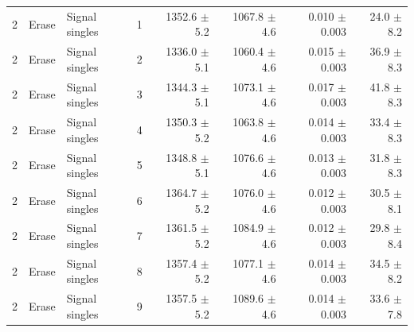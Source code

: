 \begin{tabular}{llllrrrr}
\midrule
2 & Erase & Signal singles & 1 & 1352.6 \ensuremath{\pm} 5.2 & 1067.8 \ensuremath{\pm} 4.6 & 0.010 \ensuremath{\pm} 0.003 & 24.0 \ensuremath{\pm} 8.2 \\
2 & Erase & Signal singles & 2 & 1336.0 \ensuremath{\pm} 5.1 & 1060.4 \ensuremath{\pm} 4.6 & 0.015 \ensuremath{\pm} 0.003 & 36.9 \ensuremath{\pm} 8.3 \\
2 & Erase & Signal singles & 3 & 1344.3 \ensuremath{\pm} 5.1 & 1073.1 \ensuremath{\pm} 4.6 & 0.017 \ensuremath{\pm} 0.003 & 41.8 \ensuremath{\pm} 8.3 \\
2 & Erase & Signal singles & 4 & 1350.3 \ensuremath{\pm} 5.2 & 1063.8 \ensuremath{\pm} 4.6 & 0.014 \ensuremath{\pm} 0.003 & 33.4 \ensuremath{\pm} 8.3 \\
2 & Erase & Signal singles & 5 & 1348.8 \ensuremath{\pm} 5.1 & 1076.6 \ensuremath{\pm} 4.6 & 0.013 \ensuremath{\pm} 0.003 & 31.8 \ensuremath{\pm} 8.3 \\
2 & Erase & Signal singles & 6 & 1364.7 \ensuremath{\pm} 5.2 & 1076.0 \ensuremath{\pm} 4.6 & 0.012 \ensuremath{\pm} 0.003 & 30.5 \ensuremath{\pm} 8.1 \\
2 & Erase & Signal singles & 7 & 1361.5 \ensuremath{\pm} 5.2 & 1084.9 \ensuremath{\pm} 4.6 & 0.012 \ensuremath{\pm} 0.003 & 29.8 \ensuremath{\pm} 8.4 \\
2 & Erase & Signal singles & 8 & 1357.4 \ensuremath{\pm} 5.2 & 1077.1 \ensuremath{\pm} 4.6 & 0.014 \ensuremath{\pm} 0.003 & 34.5 \ensuremath{\pm} 8.2 \\
2 & Erase & Signal singles & 9 & 1357.5 \ensuremath{\pm} 5.2 & 1089.6 \ensuremath{\pm} 4.6 & 0.014 \ensuremath{\pm} 0.003 & 33.6 \ensuremath{\pm} 7.8 \\
\bottomrule
\end{tabular}
